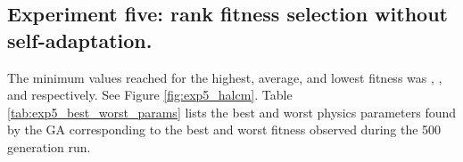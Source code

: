 

\newpage

\subsection[Experiment Five]{Experiment five: rank fitness selection without self-adaptation.}

The minimum values reached for the highest, average, and lowest fitness was , , and respectively. See Figure \ref{fig:exp5_halcm}. Table \ref{tab:exp5_best_worst_params} lists the best and worst physics parameters found by the GA corresponding to the best and worst fitness observed during the 500 generation run.

